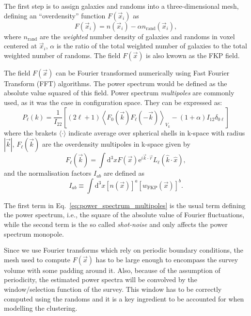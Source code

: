 The first step is to assign galaxies and randoms into a three-dimensional mesh, 
defining an ``overdensity'' function $F(\vec{x}_i)$ as 
\begin{equation}
    F(\vec{x}_i) =  n(\vec{x}_i) - \alpha n_\text{rand}(\vec{x}_i),
    \label{eq:overdensity_fourier}
\end{equation}
where $n_\text{rand}$ are the \emph{weighted} number density of galaxies and randoms in voxel centered at $\vec{x}_i$, 
$\alpha$ is the ratio of the total weighted number of galaxies to the total weighted number of randoms. 
The field $F(\vec{x})$ is also kwown as the FKP field. 

The field $F(\vec{x})$ can be Fourier transformed numerically using Fast Fourier Transform (FFT) 
algorithms. The power spectrum would be defined as the absolute value squared of this field. 
Power spectrum \emph{multipoles} are commonly 
used, as it was the case in configuration space. 
They can be expressed as: 
\begin{equation}
 P_\ell(k) = \frac{1}{I_{22}} \left[ (2\ell+1) \left\langle F_0(\vec{k})F_\ell(-\vec{k}) \right\rangle_{V_k} - (1+\alpha)I_{12} \delta_{0\ell} \right]
 \label{eq:power_spectrum_multipoles}
\end{equation}
where the brakets $\langle \cdot \rangle$ indicate average over spherical shells in k-space with radius $|\vec{k}|$, 
$F_\ell(\vec{k})$ are the overdensity multipoles in k-space given by 
\begin{equation}
    F_\ell(\vec{k}) = \int \text{d}^3x F(\vec{x}) \text{e}^{i \vec{k}\cdot \vec{r}} L_\ell( \hat{k} \cdot \hat{x}), 
\end{equation}
and the normalisation factors $I_{ab}$ are defined as 
\begin{equation}
 I_{ab} \equiv \int \text{d}^3 x [n(\vec{x})]^a [w_\text{FKP}(\vec{x})]^b. 
 \label{eq:normalisation_power_spectrum}
\end{equation}

The first term in Eq.~\ref{eq:power_spectrum_multipoles} is the usual term defining the power spectrum, i.e., 
the square of the absolute value of Fourier fluctuations, while the second term is the so called \emph{shot-noise} 
and only affects the power spectrum monopole. 

Since we use Fourier transforms which rely on periodic boundary conditions, the mesh used to compute $F(\vec{x})$
has to be large enough to encompass the survey volume with some padding around it. 
Also, because of the assumption of periodicity, the estimated power spectra will be convolved by the window/selection function of the survey.
This window has to be correctly computed using the randoms and 
it is a key ingredient to be accounted for when modelling the clustering. 

